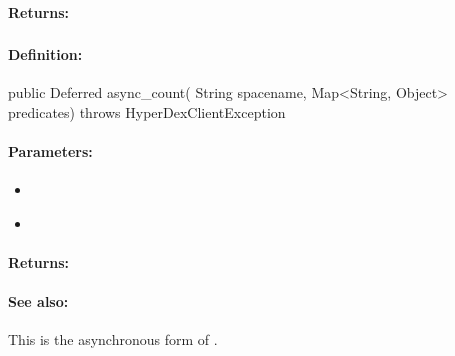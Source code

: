 \paragraph{Returns:}


\pagebreak
\subsubsection{}
\label{api:java:async_count}


\paragraph{Definition:}
\begin{javacode}
public Deferred async_count(
        String spacename,
        Map<String, Object> predicates) throws HyperDexClientException
\end{javacode}

\paragraph{Parameters:}
\begin{itemize}[noitemsep]
\item {}\\

\item {}\\

\end{itemize}

\paragraph{Returns:}


\paragraph{See also:}  This is the asynchronous form of .
